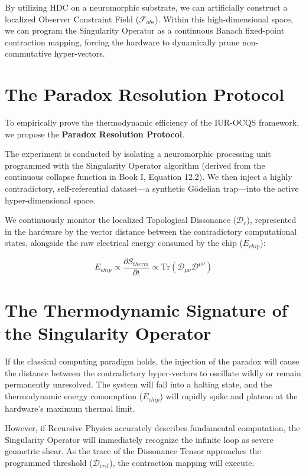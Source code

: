 \documentclass[12pt,openany]{book}
\begin{document}
By utilizing HDC on a neuromorphic substrate, we can artificially construct a localized Observer Constraint Field ($\mathcal{F}_{obs}$). Within this high-dimensional space, we can program the Singularity Operator as a continuous Banach fixed-point contraction mapping, forcing the hardware to dynamically prune non-commutative hyper-vectors.

\section{The Paradox Resolution Protocol}
To empirically prove the thermodynamic efficiency of the IUR-OCQS framework, we propose the \textbf{Paradox Resolution Protocol}. 

The experiment is conducted by isolating a neuromorphic processing unit programmed with the Singularity Operator algorithm (derived from the continuous collapse function in Book I, Equation 12.2). We then inject a highly contradictory, self-referential dataset—a synthetic G\"{o}delian trap—into the active hyper-dimensional space.

We continuously monitor the localized Topological Dissonance ($\mathcal{D}_{r}$), represented in the hardware by the vector distance between the contradictory computational states, alongside the raw electrical energy consumed by the chip ($E_{chip}$):

\begin{equation}
E_{chip} \propto \frac{\partial S_{therm}}{\partial t} \propto \text{Tr}(\mathcal{D}_{\mu\nu} \mathcal{D}^{\mu\nu})
\end{equation}

\section{The Thermodynamic Signature of the Singularity Operator}
If the classical computing paradigm holds, the injection of the paradox will cause the distance between the contradictory hyper-vectors to oscillate wildly or remain permanently unresolved. The system will fall into a halting state, and the thermodynamic energy consumption ($E_{chip}$) will rapidly spike and plateau at the hardware's maximum thermal limit.

However, if Recursive Physics accurately describes fundamental computation, the Singularity Operator will immediately recognize the infinite loop as severe geometric shear. As the trace of the Dissonance Tensor approaches the programmed threshold ($\mathcal{D}_{crit}$), the contraction mapping will execute. 
\end{document}
